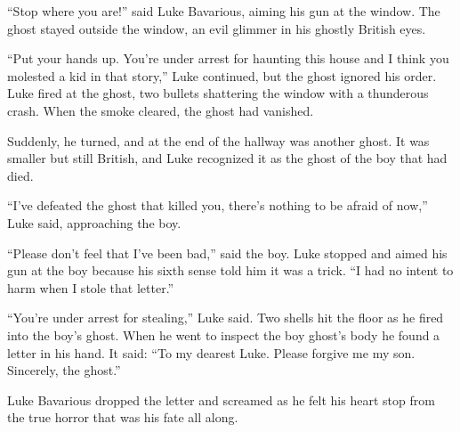 ``Stop where you are!'' said Luke Bavarious, aiming his gun at the
window. The ghost stayed outside the window, an evil glimmer in his
ghostly British eyes.



``Put your hands up. You're under arrest for haunting this house and
I think you molested a kid in that story,'' Luke continued, but the
ghost ignored his order. Luke fired at the ghost, two bullets
shattering the window with a thunderous crash. When the smoke
cleared, the ghost had vanished.



Suddenly, he turned, and at the end of the hallway was another
ghost. It was smaller but still British, and Luke recognized it as
the ghost of the boy that had died.



``I've defeated the ghost that killed you, there's nothing to be
afraid of now,'' Luke said, approaching the boy.



``Please don't feel that I've been bad,'' said the boy. Luke stopped
and aimed his gun at the boy because his sixth sense told him it
was a trick. ``I had no intent to harm when I stole that
letter.''



``You're under arrest for stealing,'' Luke said. Two shells hit the
floor as he fired into the boy's ghost. When he went to inspect the
boy ghost's body he found a letter in his hand. It said: ``To my
dearest Luke. Please forgive me my son. Sincerely, the
ghost.''



Luke Bavarious dropped the letter and screamed as he felt his heart
stop from the true horror that was his fate all along. 

 






